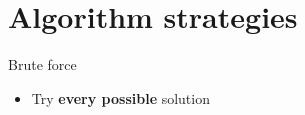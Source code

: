 \part{Algorithm strategies}
\frame{\partpage}

\begin{frame}{Brute force}
	\begin{itemize}
		\pause\item Try \textbf{every possible} solution
	\end{itemize}
\end{frame}


